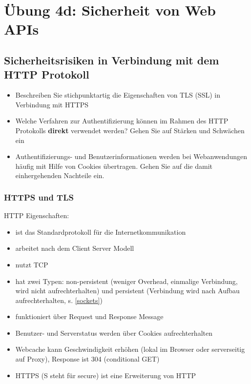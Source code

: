\documentclass[notitlepage, hidelinks]{article}
\begin{document}
\newpage
\section{Übung 4d: Sicherheit von Web APIs}
\subsection{Sicherheitsrisiken in Verbindung mit dem HTTP Protokoll}
\begin{itemize}
\item Beschreiben Sie stichpunktartig die Eigenschaften von TLS (SSL) in Verbindung mit HTTPS
\item Welche Verfahren zur Authentifizierung können im Rahmen des HTTP Protokolls \textbf{direkt} verwendet werden? Gehen Sie auf Stärken und Schwächen ein
\item Authentifizierungs- und Benutzerinformationen werden bei Webanwendungen häufig mit Hilfe von Cookies übertragen. Gehen Sie auf die damit einhergehenden Nachteile ein. 
\end{itemize}

\subsubsection{HTTPS und TLS}
HTTP Eigenschaften:
\begin{itemize}
\item ist das Standardprotokoll für die Internetkommunikation
\item arbeitet nach dem Client Server Modell
\item nutzt TCP
\item hat zwei Typen: non-persistent (weniger Overhead, einmalige Verbindung, wird nicht aufrechterhalten) und persistent (Verbindung wird nach Aufbau aufrechterhalten, s. \ref{sockets})
\item funktioniert über Request und Response Message
\item Benutzer- und Serverstatus werden über Cookies aufrechterhalten
\item Webcache kann Geschwindigkeit erhöhen (lokal im Browser oder serverseitig auf Proxy), Response ist 304 (conditional GET)
\item HTTPS (S steht für secure) ist eine Erweiterung von HTTP
\end{itemize}
\end{document}
